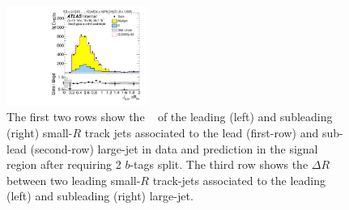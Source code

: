 \begin{figure}[htb!]
\begin{center}
\includegraphics[width=0.41\textwidth,angle=-90]{figures/boosted/Signal/b77_TwoTag_split_Signal_sublHCand_trk_dr.pdf}
  \caption{The first two rows show the \pt~ of the leading (left) and subleading (right) small-$R$ track jets associated to the lead (first-row) and sub-lead (second-row) large-\R jet in data and prediction in the signal region after requiring 2 $b$-tags split. The third row shows the $\Delta R$ between two leading small-$R$ track-jets associated to the leading (left) and subleading (right) large-\R jet.  }
  \label{fig:boosted-2bs-signal-ak2}
\end{center}
\end{figure}


